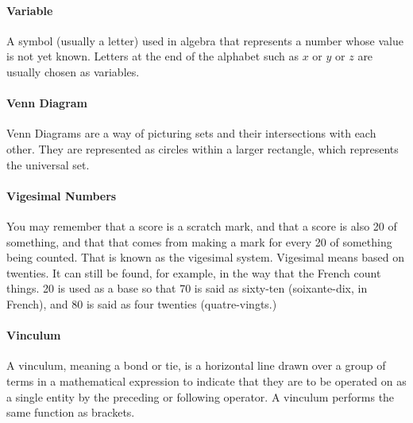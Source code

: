 \documentclass[12pt]{article}
\begin{document}
\paragraph{Variable}
A symbol (usually a letter) used in algebra that represents a number whose value is not yet known. Letters at the end of the alphabet such as $x$ or $y$ or $z$ are usually chosen as variables.

\paragraph{Venn Diagram}
Venn Diagrams are a way of picturing sets and their intersections with each other. They are represented as circles within a larger rectangle, which represents the universal set.

\begin{center}
\end{center}

\paragraph{Vigesimal Numbers}
You may remember that a score is a scratch mark, and that a score is also 20 of something, and that that comes from making a mark for every 20 of something being counted. That is known as the vigesimal system. Vigesimal means based on twenties. It can still be found, for example, in the way that the French count things. 20 is used as a base so that 70 is said as sixty-ten (soixante-dix, in French), and 80 is said as four twenties (quatre-vingts.)

\paragraph{Vinculum}
A vinculum, meaning a bond or tie, is a horizontal line drawn over a group of terms in a mathematical expression to indicate that they are to be operated on as a single entity by the preceding or following operator. A vinculum performs the same function as brackets.
\end{document}

